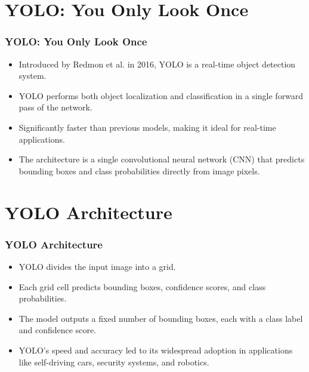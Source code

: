 \documentclass{beamer}
\begin{document}
\section{YOLO: You Only Look Once}
\begin{frame}
\frametitle{\textbf{YOLO: You Only Look Once}}
\begin{itemize}
    \item Introduced by Redmon et al. in 2016, YOLO is a real-time object detection system.
    \item YOLO performs both object localization and classification in a single forward pass of the network.
    \item Significantly faster than previous models, making it ideal for real-time applications.
    \item The architecture is a single convolutional neural network (CNN) that predicts bounding boxes and class probabilities directly from image pixels.
\end{itemize}

\end{frame}


\section{YOLO Architecture}
\begin{frame}
\frametitle{\textbf{YOLO Architecture}}
\begin{itemize}
    \item YOLO divides the input image into a grid.
    \item Each grid cell predicts bounding boxes, confidence scores, and class probabilities.
    \item The model outputs a fixed number of bounding boxes, each with a class label and confidence score.
    \item YOLO's speed and accuracy led to its widespread adoption in applications like self-driving cars, security systems, and robotics.
\end{itemize}

\end{frame}
\end{document}
